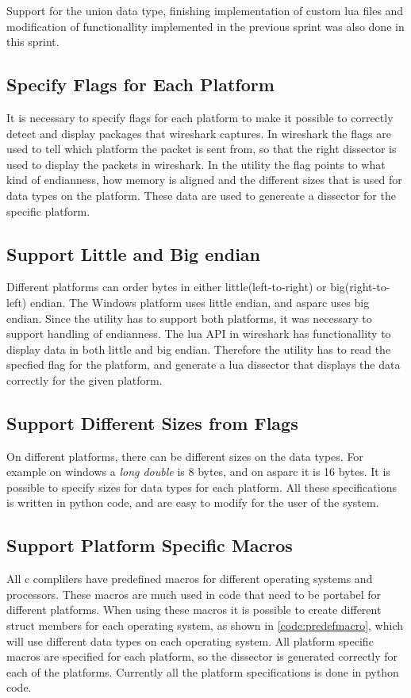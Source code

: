 Support for the \gls{union} data type, finishing implementation of custom \Gls{lua} files 
and modification of functionallity implemented in the previous sprint was also 
done in this sprint.

\subsection{Specify Flags for Each Platform}
It is necessary to specify flags for each platform to make it possible to 
correctly detect and display packages that wireshark captures. In wireshark 
the flags are used to tell which platform the \gls{packet} is sent from, so that 
the right \gls{dissector} is used to display the packets in \Gls{wireshark}. In the 
\gls{utility} the flag points to what kind of \gls{endianness}, how memory is aligned and 
the different sizes that is used for data types on the platform. These data 
are used to genereate a \gls{dissector} for the specific platform.

\subsection{Support Little and Big \Gls{endian}}
Different platforms can order bytes in either little(left-to-right) or 
big(right-to-left) \gls{endian}. The \Gls{Windows} platform uses little \gls{endian}, and \gls{asparc} 
uses big \gls{endian}. Since the \gls{utility} has to support both platforms, it was 
necessary to support handling of \gls{endianness}. The \Gls{lua} API in wireshark has 
functionallity to display data in both little and big \gls{endian}. Therefore the 
\gls{utility} has to read the specfied flag for the platform, and generate a \Gls{lua} 
\gls{dissector} that displays the data correctly for the given platform.

\subsection{Support Different Sizes from Flags}
On different platforms, there can be different sizes on the data types. For 
example on windows a \emph{long double} is 8 bytes, and on \gls{asparc} it is 16 
bytes. It is possible to specify sizes for data types for each platform. All 
these specifications is written in python code, and are easy to modify for the 
user of the system.

\subsection{Support Platform Specific Macros}
All c complilers have predefined macros for different operating systems and 
processors. These macros are much used in code that need to be portabel for 
different platforms. When using these macros it is possible to create 
different struct members for each operating system, as shown in 
\autoref{code:predefmacro}, which will use different data types on each 
operating system. All platform specific macros are specified for each 
platform, so the dissector is generated correctly for each of the platforms. 
Currently all the platform specifications is done in python code.

